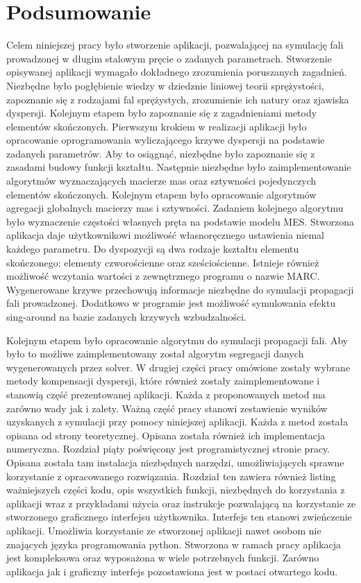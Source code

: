 \chapter{Podsumowanie}
\label{cha:podsumowanie}

Celem niniejszej pracy było stworzenie aplikacji, pozwalającej na symulację fali prowadzonej w długim stalowym pręcie o zadanych parametrach. Stworzenie opisywanej aplikacji wymagało dokładnego zrozumienia poruszanych zagadnień. Niezbędne było pogłębienie wiedzy w dziedznie liniowej teorii sprężystości, zapoznanie się z rodzajami fal sprężystych, zrozumienie ich natury oraz zjawiska dyspersji. Kolejnym etapem było zapoznanie się z zagadnieniami metody elementów skończonych. Pierwszym krokiem w realizacji aplikacji było opracowanie oprogramowania wyliczającego krzywe dyspersji na podstawie zadanych parametrów. Aby to osiągnąć, niezbędne było zapoznanie się z zasadami budowy funkcji kształtu. Następnie niezbędne było zaimplementowanie algorytmów wyznaczających macierze mas oraz sztywności pojedynczych elementów skończonych. Kolejnym etapem było opracowanie algorytmów agregacji globalnych macierzy mas i sztywności. Zadaniem kolejnego algorytmu było wyznaczenie częstości własnych pręta na podstawie modelu MES. Stworzona aplikacja daje użytkownikowi możliwość własnoręcznego ustawienia niemal każdego parametru. Do dyspozycji są dwa rodzaje kształtu elementu skończonego: elementy czworościenne oraz sześciościenne. Istnieje również możliwość wczytania wartości z zewnętrznego programu o nazwie MARC. Wygenerowane krzywe przechowują informacje niezbędne do symulacji propagacji fali prowadzonej. Dodatkowo w programie jest możliwość symulowania efektu sing-around na bazie zadanych krzywych wzbudzalności.

Kolejnym etapem było opracowanie algorytmu do symulacji propagacji fali. Aby było to możliwe zaimplementowany został algorytm segregacji danych wygenerowanych przez solver. W drugiej części pracy omówione zostały wybrane metody kompensacji dyspersji, które również zostały zaimplementowane i stanowią część prezentowanej aplikacji. Każda z proponowanych metod ma zarówno wady jak i zalety. Ważną część pracy stanowi zestawienie wyników uzyskanych z symulacji przy pomocy niniejszej aplikacji. Każda z metod została opisana od strony teoretycznej. Opisana została również ich implementacja numeryczna. Rozdział piąty poświęcony jest programistycznej stronie pracy. Opisana została tam instalacja niezbędnych narzędzi, umożliwiających sprawne korzystanie z opracowanego rozwiązania. Rozdział ten zawiera również listing ważniejszych części kodu, opis wszystkich funkcji, niezbędnych do korzystania z aplikacji wraz z przykładami użycia oraz instrukcje pozwalającą na korzystanie ze stworzonego graficznego interfejsu użytkownika. Interfejs ten stanowi zwieńczenie aplikacji. Umożliwia korzystanie ze stworzonej aplikacji nawet osobom nie znających języka programowania python. Stworzona w ramach pracy aplikacja jest kompleksowa oraz wyposażona w wiele potrzebnych funkcji. Zarówno aplikacja jak i graficzny interfejs pozostawiona jest w postaci otwartego kodu. 

